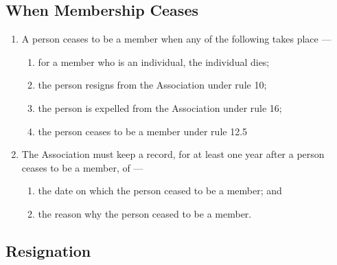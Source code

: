 \documentclass[../constitution.tex]{subfiles}
\begin{document}
\subsection{When Membership Ceases} \label{when-membership-ceases}

\begin{enumerate}

\item A person ceases to be a member when any of the following takes place ---

  \begin{enumerate}
  
  \item for a member who is an individual, the individual dies;
  \item the person resigns from the Association under rule 10;
  \item the person is expelled from the Association under rule 16;
  \item the person ceases to be a member under rule 12.5
  \end{enumerate}
\item The Association must keep a record, for at least one year after a person ceases to be a member, of ---

  \begin{enumerate}
  
  \item the date on which the person ceased to be a member; and
  \item the reason why the person ceased to be a member.
  \end{enumerate}
\end{enumerate}

\subsection{Resignation} \label{resignation}
\end{document}
